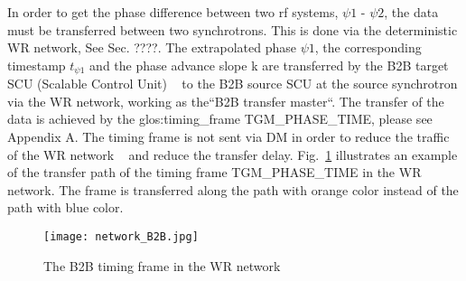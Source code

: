 In order to get the phase difference between two rf systems, $\psi1$ - $\psi2$, the data must be transferred between two synchrotrons. This is done via the deterministic WR network, See Sec. ????. The extrapolated phase $\psi1$, the corresponding timestamp $t_{\psi1}$ and the phase advance slope k are transferred by the B2B target SCU (Scalable Control Unit) ~\cite{beck_new_2012, thieme_scu_2013} to the B2B source SCU at the source synchrotron via the WR network, working as the“B2B transfer master“. The transfer of the data is achieved by the \gls{glos:timing_frame} TGM\_PHASE\_TIME, please see Appendix A. The timing frame is not sent via DM in order to reduce the traffic of the WR network ~\cite{bai_concept_2016} and reduce the transfer delay. Fig.~\ref{network_B2B} illustrates an example of the transfer path of the timing frame TGM\_PHASE\_TIME in the WR network. The frame is transferred along the path with orange color instead of the path with blue color. 
 \begin{figure}[!htb]
   \centering   
   \texttt{[image: network\_B2B.jpg]}
   \caption{The B2B timing frame in the WR network}
   \label{network_B2B}
\end{figure}
